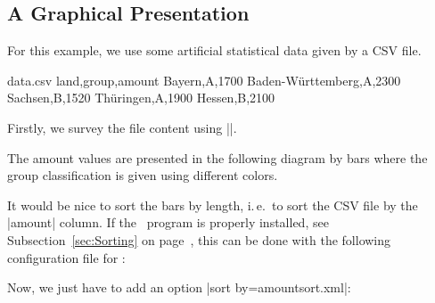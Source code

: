 \documentclass[a4paper,11pt]{ltxdoc}
\begin{document}
\clearpage
\subsection{A Graphical Presentation}\label{sec:examgrapghpres}%
For this example, we use some artificial statistical data given by a CSV file.

\begin{tcbverbatimwrite}{data.csv}
land,group,amount
Bayern,A,1700
Baden-Württemberg,A,2300
Sachsen,B,1520
Thüringen,A,1900
Hessen,B,2100
\end{tcbverbatimwrite}


Firstly, we survey the file content using
|\csvautobooktabular|.

\begin{dispExample}
\end{dispExample}

The amount values are presented in the following diagram by bars where
the group classification is given using different colors.

\begin{dispExample}
\end{dispExample}


\clearpage
It would be nice to sort the bars by length, i.\,e.\ to sort the CSV file
by the |amount| column. If the \csvsorter\ program is properly installed,
see Subsection~\ref{sec:Sorting} on page~\pageref{sec:Sorting},
this can be done with the following configuration file for \csvsorter:


Now, we just have to add an option |sort by=amountsort.xml|:
\begin{dispExample}
\end{dispExample}
\end{document}
